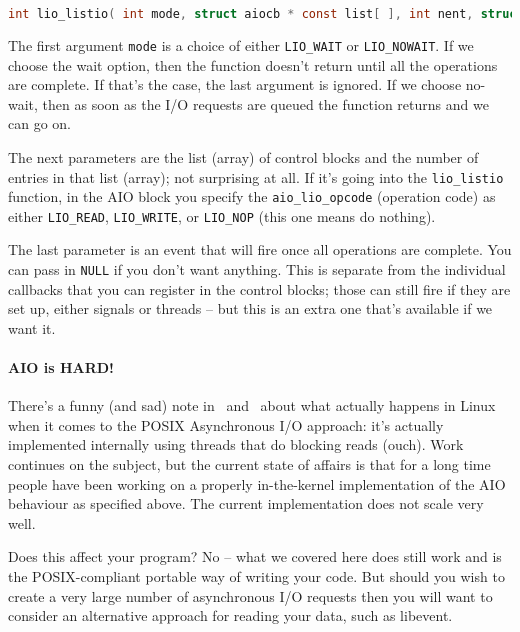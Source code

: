 \begin{lstlisting}[language=C]
int lio_listio( int mode, struct aiocb * const list[ ], int nent, struct sigevent* sigev );
\end{lstlisting}

The first argument \texttt{mode} is a choice of either \texttt{LIO\_WAIT} or \texttt{LIO\_NOWAIT}. If we choose the wait option, then the function doesn't return until all the operations are complete. If that's the case, the last argument is ignored. If we choose no-wait, then as soon as the I/O requests are queued the function returns and we can go on.

The next parameters are the list (array) of control blocks and the number of entries in that list (array); not surprising at all. If it's going into the \texttt{lio\_listio} function, in the AIO block you specify the \texttt{aio\_lio\_opcode} (operation code) as either \texttt{LIO\_READ}, \texttt{LIO\_WRITE}, or \texttt{LIO\_NOP} (this one means do nothing).

The last parameter is an event that will fire once all operations are complete. You can pass in \texttt{NULL} if you don't want anything. This is separate from the individual callbacks that you can register in the control blocks; those can still fire if they are set up, either signals or threads -- but this is an extra one that's available if we want it.

\paragraph{AIO is HARD!}
There's a funny (and sad) note in~\cite{lpi} and~\cite{linuxaio} about what actually happens in Linux when it comes to the POSIX Asynchronous I/O approach: it's actually implemented internally using threads that do blocking reads (ouch). Work continues on the subject, but the current state of affairs is that for a long time people have been working on a properly in-the-kernel implementation of the AIO behaviour as specified above. The current implementation does not scale very well.

Does this affect your program? No -- what we covered here does still work and is the POSIX-compliant portable way of writing your code. But should you wish to create a very large number of asynchronous I/O requests then you will want to consider an alternative approach for reading your data, such as libevent. 




